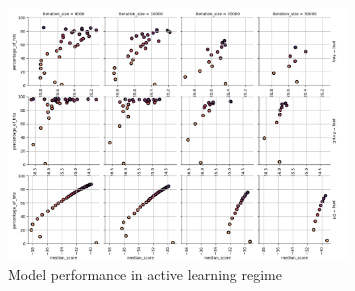 \begin{figure}[h]
\centering
\includegraphics[width=0.8\textwidth]{figures/Figure_3_dockscore.png}
\caption{Model performance in active learning regime}
\label{fig:fig_3}
\end{figure}
